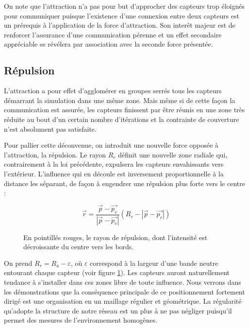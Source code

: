 \documentclass[10pt]{article}
\begin{document}
\begin{multicols}{2}
On note que l'attraction n'a pas pour but d'approcher des capteurs
trop éloignés pour communiquer puisque l'existence d'une connexion
entre deux capteurs est un prérequis à l'application de la force
d'attraction. Son interêt majeur est de renforcer l'assurance d'une
communication pérenne et un effet secondaire appréciable se révélera
par association avec la seconde force présentée.

\subsection*{Répulsion}

L'attraction a pour effet d'agglomérer en groupes serrés tous les
capteurs démarrant la simulation dans une même zone. Mais même si de
cette façon la communication est assurée, les capteurs finissent par
être réunis en une zone très réduite au bout d'un certain nombre
d'itérations et la contrainte de couverture n'est absolument pas
satisfaite.

Pour pallier cette déconvenue, on introduit une nouvelle force opposée
à l'attraction, la répulsion. Le rayon $R_r$ définit une nouvelle zone
radiale qui, contrairement à la loi précédente, expulsera les capteurs
envahissants vers l'extérieur. L'influence qui en découle est
inversement proportionnelle à la distance les séparant, de façon à
engendrer une répulsion plus forte vers le centre \cite{Cheng2011497}
:

$$
\vec{r} = \frac{\vec{p} - \vec{p_v}}{|\vec{p} - \vec{p_v}|}(R_r - |\vec{p} - \vec{p_v}|)
$$

\begin{figure}[H]

  \centering

  

  \caption{En pointillés rouges, le rayon de répulsion, dont
    l'intensité est décroissante du centre vers les bords.}
  \label{repulsion}

\end{figure}

On prend $R_r = R_a - \varepsilon$, o\`u $\varepsilon$ correspond à la
largeur d'une bande neutre entourant chaque capteur (voir figure
\ref{repulsion}). Les capteurs auront naturellement tendance à
s'installer dans ces zones libre de toute influence. Nous verrons dans
les démonstrations que la conséquence principale de ce positionnement
fortement dirigé est une organisation en un maillage régulier et
géométrique. La régularité qu'adopte la structure de notre réseau est
un plus à ne pas négliger puisqu'il permet des mesures de
l'environnement homogènes.


\end{multicols}
\end{document}
